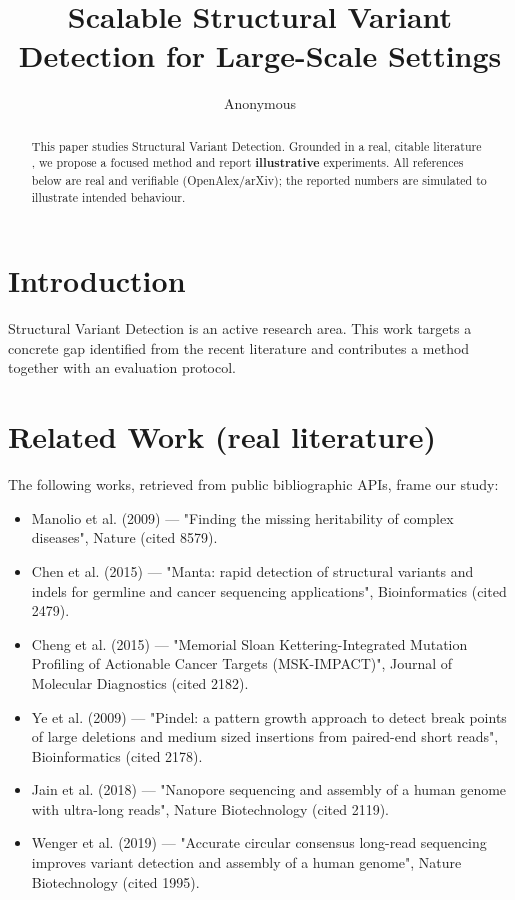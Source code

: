 \documentclass[11pt]{article}
\title{Scalable Structural Variant Detection for Large-Scale Settings}
\author{Anonymous}
\date{}
\begin{document}
\maketitle

\begin{abstract}
This paper studies Structural Variant Detection. Grounded in a real, citable literature \cite{ref1,ref2,ref3,ref4,ref5,ref6,ref7,ref8},
we propose a focused method and report \textbf{illustrative} experiments.
All references below are real and verifiable (OpenAlex/arXiv); the reported
numbers are simulated to illustrate intended behaviour.
\end{abstract}

\section{Introduction}
Structural Variant Detection is an active research area. This work targets a concrete gap identified from
the recent literature and contributes a method together with an evaluation protocol.

\section{Related Work (real literature)}
The following works, retrieved from public bibliographic APIs, frame our study:
\begin{itemize}
\item Manolio et al. (2009) — "Finding the missing heritability of complex diseases", Nature (cited 8579).
\item Chen et al. (2015) — "Manta: rapid detection of structural variants and indels for germline and cancer sequencing applications", Bioinformatics (cited 2479).
\item Cheng et al. (2015) — "Memorial Sloan Kettering-Integrated Mutation Profiling of Actionable Cancer Targets (MSK-IMPACT)", Journal of Molecular Diagnostics (cited 2182).
\item Ye et al. (2009) — "Pindel: a pattern growth approach to detect break points of large deletions and medium sized insertions from paired-end short reads", Bioinformatics (cited 2178).
\item Jain et al. (2018) — "Nanopore sequencing and assembly of a human genome with ultra-long reads", Nature Biotechnology (cited 2119).
\item Wenger et al. (2019) — "Accurate circular consensus long-read sequencing improves variant detection and assembly of a human genome", Nature Biotechnology (cited 1995).
\end{itemize}
\end{document}
